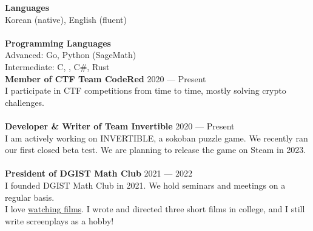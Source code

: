 \documentclass[a4paper, 11pt]{article}
\begin{document}
\textbf{Languages} \\
Korean (native), English (fluent) \\
\\
\textbf{Programming Languages} \\
Advanced: Go, Python (SageMath)\\
Intermediate: C, \CC, C\#, Rust \\

\textbf{Member of CTF Team CodeRed} \hfill 2020 --- Present \\
I participate in CTF competitions from time to time, mostly solving crypto challenges. \\
\\
\textbf{Developer \& Writer of Team Invertible} \hfill 2020 --- Present \\
I am actively working on INVERTIBLE, a sokoban puzzle game. We recently ran our first closed beta test. We are planning to release the game on Steam in 2023. \\
\\
\textbf{President of DGIST Math Club} \hfill 2021 --- 2022 \\
I founded DGIST Math Club in 2021. We hold seminars and meetings on a regular basis. \\

I love \href{https://letterboxd.com/sp301415/}{watching films}. I wrote and directed three short films in college, and I still write screenplays as a hobby!
\end{document}
